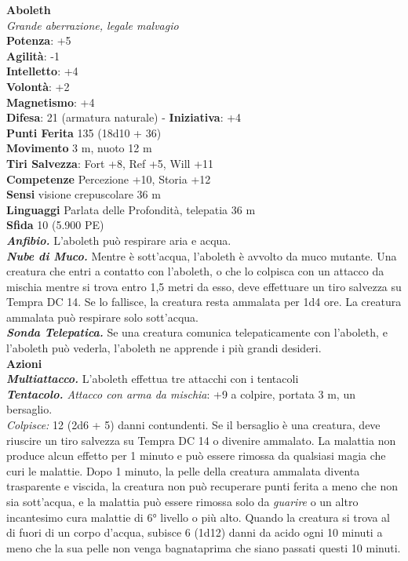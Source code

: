 \begin{multicols}{2}
\textbf{Aboleth}\\
\emph{Grande aberrazione, legale malvagio}\\
\textbf{Potenza}: +5\\
\textbf{Agilità}: -1\\
\textbf{Intelletto}: +4\\
\textbf{Volontà}: +2\\
\textbf{Magnetismo}: +4\\
\textbf{Difesa}: 21 (armatura naturale) - \textbf{Iniziativa}: +4\\
\textbf{Punti Ferita} 135 (18d10 + 36)\\
\textbf{Movimento} 3 m, nuoto 12 m\\
\textbf{Tiri Salvezza}: Fort +8, Ref +5, Will +11\\
\textbf{Competenze} Percezione +10, Storia +12\\
\textbf{Sensi} visione crepuscolare 36 m\\
\textbf{Linguaggi} Parlata delle Profondità, telepatia 36 m\\
\textbf{Sfida} 10 (5.900 PE)\\
\smallskip
\emph{\textbf{Anfibio.}} L'aboleth può respirare aria e acqua.\\
\emph{\textbf{Nube di Muco.}} Mentre è sott'acqua, l'aboleth è avvolto da muco mutante. Una creatura che entri a contatto con l'aboleth, o che lo colpisca con un attacco da mischia mentre si trova entro 1,5 metri da esso, deve effettuare un tiro salvezza su Tempra DC 14. Se lo fallisce, la creatura resta ammalata per 1d4 ore. La creatura ammalata può respirare solo sott'acqua.\\
\emph{\textbf{Sonda Telepatica.}} Se una creatura comunica telepaticamente con l'aboleth, e l'aboleth può vederla, l'aboleth ne apprende i più grandi desideri. \\
\smallskip\textbf{Azioni}\\
\emph{\textbf{Multiattacco.}} L'aboleth effettua tre attacchi con i tentacoli\\
\emph{\textbf{Tentacolo.} Attacco con arma da mischia}: +9 a colpire, portata 3 m, un bersaglio.\\
\emph{Colpisce:} 12 (2d6 + 5) danni contundenti. Se il bersaglio è una creatura, deve riuscire un tiro salvezza su Tempra DC 14 o divenire ammalato. La malattia non produce alcun effetto per 1 minuto e può essere rimossa da qualsiasi magia che curi le malattie. Dopo 1 minuto, la pelle della creatura ammalata diventa trasparente e viscida, la creatura non può recuperare punti ferita a meno che non sia sott'acqua, e la malattia può essere rimossa solo da \emph{guarire} o un altro incantesimo cura malattie di 6° livello o più alto. Quando la creatura si trova al di fuori di un corpo d'acqua, subisce 6 (1d12) danni da acido ogni 10 minuti a meno che la sua pelle non venga bagnataprima che siano  passati questi 10 minuti. \\

\end{multicols}
